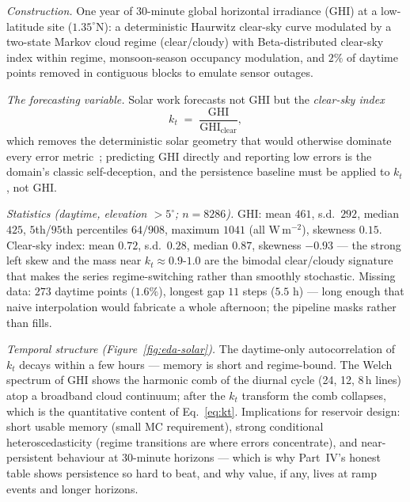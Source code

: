 \emph{Construction.} One year of 30-minute global horizontal irradiance (GHI)
at a low-latitude site ($1.35^\circ$N): a deterministic Haurwitz clear-sky
curve modulated by a two-state Markov cloud regime (clear/cloudy) with
Beta-distributed clear-sky index within regime, monsoon-season occupancy
modulation, and $2\%$ of daytime points removed in contiguous blocks to
emulate sensor outages.

\emph{The forecasting variable.} Solar work forecasts not GHI but the
\emph{clear-sky index}
\begin{equation}
  k_t \;=\; \frac{\mathrm{GHI}}{\mathrm{GHI}_{\mathrm{clear}}},
  \label{eq:kt}
\end{equation}
which removes the deterministic solar geometry that would otherwise dominate
every error metric~\citep{inman2013solar,yang2018history}; predicting GHI
directly and reporting low errors is the domain's classic self-deception, and
the persistence baseline must be applied to $k_t$, not GHI.

\emph{Statistics (daytime, elevation $>5^\circ$; $n=8286$).} GHI: mean
$461$, s.d.\ $292$, median $425$, $5$th/$95$th percentiles $64/908$, maximum
$1041$ (all $\mathrm{W\,m^{-2}}$), skewness $0.15$. Clear-sky index: mean
$0.72$, s.d.\ $0.28$, median $0.87$, skewness $-0.93$ --- the strong left skew
and the mass near $k_t\!\approx\!0.9$-$1.0$ are the bimodal
clear/cloudy signature that makes the series regime-switching rather than
smoothly stochastic. Missing data: $273$ daytime points ($1.6\%$), longest
gap $11$ steps ($5.5$ h) --- long enough that naive interpolation would
fabricate a whole afternoon; the pipeline masks rather than fills.

\emph{Temporal structure (Figure~\ref{fig:eda-solar}).} The daytime-only
autocorrelation of $k_t$ decays within a few hours --- memory is short and
regime-bound. The Welch spectrum of GHI shows the harmonic comb of the
diurnal cycle (24, 12, 8\,h lines) atop a broadband cloud continuum; after
the $k_t$ transform the comb collapses, which is the quantitative content of
Eq.~\eqref{eq:kt}. Implications for reservoir design: short usable memory
(small $\mathrm{MC}$ requirement), strong conditional heteroscedasticity
(regime transitions are where errors concentrate), and near-persistent
behaviour at 30-minute horizons --- which is why Part~IV's honest table shows
persistence so hard to beat, and why value, if any, lives at ramp events and
longer horizons.

